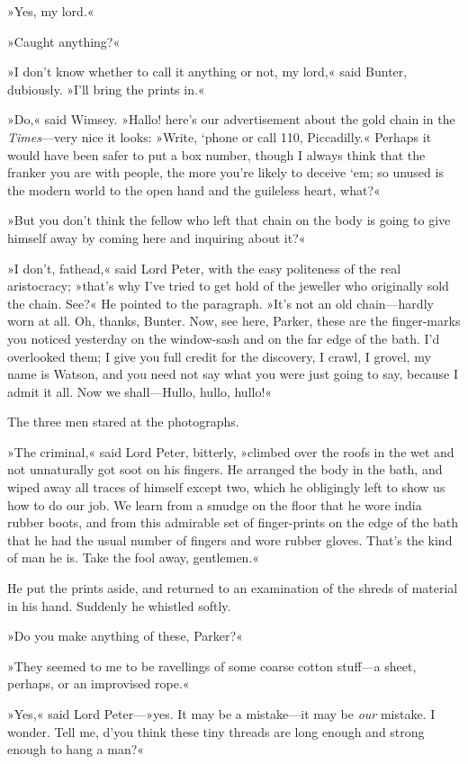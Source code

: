 »Yes, my lord.«

»Caught anything?«

»I don't know whether to call it anything or not, my lord,« said Bunter, dubiously. »I'll bring the prints in.«

»Do,« said Wimsey. »Hallo! here's our advertisement about the gold chain in the \textit{Times}---very nice it looks: »Write, `phone or call 110, Piccadilly.« Perhaps it would have been safer to put a box number, though I always think that the franker you are with people, the more you're likely to deceive `em; so unused is the modern world to the open hand and the guileless heart, what?«

»But you don't think the fellow who left that chain on the body is going to give himself away by coming here and inquiring about it?«

»I don't, fathead,« said Lord Peter, with the easy politeness of the real aristocracy; »that's why I've tried to get hold of the jeweller who originally sold the chain. See?« He pointed to the paragraph. »It's not an old chain—hardly worn at all. Oh, thanks, Bunter. Now, see here, Parker, these are the finger-marks you noticed yesterday on the window-sash and on the far edge of the bath. I'd overlooked them; I give you full credit for the discovery, I crawl, I grovel, my name is Watson, and you need not say what you were just going to say, because I admit it all. Now we shall—Hullo, hullo, hullo!«

The three men stared at the photographs.

»The criminal,« said Lord Peter, bitterly, »climbed over the roofs in the wet and not unnaturally got soot on his fingers. He arranged the body in the bath, and wiped away all traces of himself except two, which he obligingly left to show us how to do our job. We learn from a smudge on the floor that he wore india rubber boots, and from this admirable set of finger-prints on the edge of the bath that he had the usual number of fingers and wore rubber gloves. That's the kind of man he is. Take the fool away, gentlemen.«

He put the prints aside, and returned to an examination of the shreds of material in his hand. Suddenly he whistled softly.

»Do you make anything of these, Parker?«

»They seemed to me to be ravellings of some coarse cotton stuff—a sheet, perhaps, or an improvised rope.«

»Yes,« said Lord Peter---»yes. It may be a mistake—it may be \textit{our} mistake. I wonder. Tell me, d'you think these tiny threads are long enough and strong enough to hang a man?«

